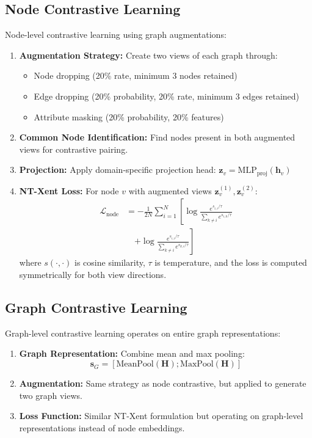 \documentclass[11pt]{article}
\begin{document}
\subsection{Node Contrastive Learning}
\label{sec:node-contrast}

Node-level contrastive learning using graph augmentations:

\begin{enumerate}
\item \textbf{Augmentation Strategy:} Create two views of each graph through:
\begin{itemize}
\item Node dropping (20\% rate, minimum 3 nodes retained)
\item Edge dropping (20\% probability, 20\% rate, minimum 3 edges retained)  
\item Attribute masking (20\% probability, 20\% features)
\end{itemize}

\item \textbf{Common Node Identification:} Find nodes present in both augmented views for contrastive pairing.

\item \textbf{Projection:} Apply domain-specific projection head: $\mathbf{z}_v = \text{MLP}_{\text{proj}}(\mathbf{h}_v)$

\item \textbf{NT-Xent Loss:} For node $v$ with augmented views $\mathbf{z}_v^{(1)}, \mathbf{z}_v^{(2)}$:
\begin{align*}
\mathcal{L}_{\text{node}} &= -\frac{1}{2N} \sum_{i=1}^{N} \left[ \log \frac{e^{s_{i,i}/\tau}}{\sum_{k \neq i} e^{s_{i,k}/\tau}} \right. \\
&\quad \left. + \log \frac{e^{s_{i,i}/\tau}}{\sum_{k \neq i} e^{s_{k,i}/\tau}} \right]
\end{align*}
where $s(\cdot,\cdot)$ is cosine similarity, $\tau$ is temperature, and the loss is computed symmetrically for both view directions.
\end{enumerate}

\subsection{Graph Contrastive Learning}
\label{sec:graph-contrast}

Graph-level contrastive learning operates on entire graph representations:

\begin{enumerate}
\item \textbf{Graph Representation:} Combine mean and max pooling:
\begin{equation*}
\mathbf{s}_G = [\text{MeanPool}(\mathbf{H}); \text{MaxPool}(\mathbf{H})]
\end{equation*}

\item \textbf{Augmentation:} Same strategy as node contrastive, but applied to generate two graph views.

\item \textbf{Loss Function:} Similar NT-Xent formulation but operating on graph-level representations instead of node embeddings.
\end{enumerate}
\end{document}
